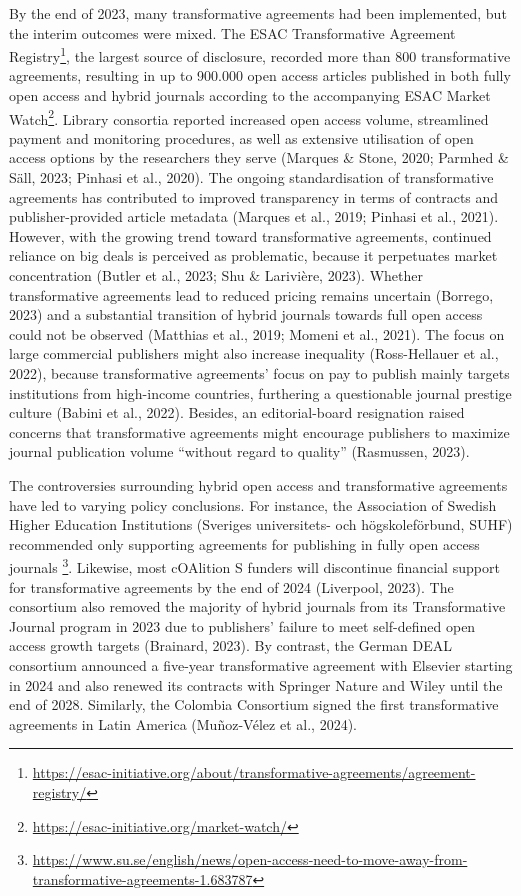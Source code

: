 \documentclass[a4paper,man,floatsintext,longtable,noextraspace,12pt]{apa6}
\begin{document}
By the end of 2023, many transformative agreements had been implemented,
but the interim outcomes were mixed. The ESAC Transformative Agreement
Registry\footnote{\url{https://esac-initiative.org/about/transformative-agreements/agreement-registry/}},
the largest source of disclosure, recorded more than 800 transformative
agreements, resulting in up to 900.000 open access articles published in
both fully open access and hybrid journals according to the accompanying
ESAC Market Watch\footnote{\url{https://esac-initiative.org/market-watch/}}.
Library consortia reported increased open access volume, streamlined
payment and monitoring procedures, as well as extensive utilisation of
open access options by the researchers they serve (Marques \& Stone,
2020; Parmhed \& Säll, 2023; Pinhasi et al., 2020). The ongoing
standardisation of transformative agreements has contributed to improved
transparency in terms of contracts and publisher-provided article
metadata (Marques et al., 2019; Pinhasi et al., 2021). However, with the
growing trend toward transformative agreements, continued reliance on
big deals is perceived as problematic, because it perpetuates market
concentration (Butler et al., 2023; Shu \& Larivière, 2023). Whether
transformative agreements lead to reduced pricing remains uncertain
(Borrego, 2023) and a substantial transition of hybrid journals towards
full open access could not be observed (Matthias et al., 2019; Momeni et
al., 2021). The focus on large commercial publishers might also increase
inequality (Ross-Hellauer et al., 2022), because transformative
agreements' focus on pay to publish mainly targets institutions from
high-income countries, furthering a questionable journal prestige
culture (Babini et al., 2022). Besides, an editorial-board resignation
raised concerns that transformative agreements might encourage
publishers to maximize journal publication volume ``without regard to
quality'' (Rasmussen, 2023).

The controversies surrounding hybrid open access and transformative
agreements have led to varying policy conclusions. For instance, the
Association of Swedish Higher Education Institutions (Sveriges
universitets- och högskoleförbund, SUHF) recommended only supporting
agreements for publishing in fully open access journals \footnote{\url{https://www.su.se/english/news/open-access-need-to-move-away-from-transformative-agreements-1.683787}}.
Likewise, most cOAlition S funders will discontinue financial support
for transformative agreements by the end of 2024 (Liverpool, 2023). The
consortium also removed the majority of hybrid journals from its
Transformative Journal program in 2023 due to publishers' failure to
meet self-defined open access growth targets (Brainard, 2023). By
contrast, the German DEAL consortium announced a five-year
transformative agreement with Elsevier starting in 2024 and also renewed
its contracts with Springer Nature and Wiley until the end of 2028.
Similarly, the Colombia Consortium signed the first transformative
agreements in Latin America (Muñoz-Vélez et al., 2024).
\end{document}

